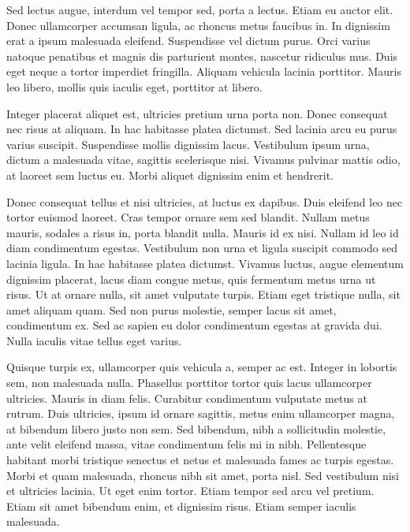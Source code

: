 \documentclass[12pt,a4paper]{article}
\begin{document}
Sed lectus augue, interdum vel tempor sed, porta a lectus. Etiam eu auctor elit. Donec ullamcorper accumsan ligula, ac rhoncus metus faucibus in. In dignissim erat a ipsum malesuada eleifend. Suspendisse vel dictum purus. Orci varius natoque penatibus et magnis dis parturient montes, nascetur ridiculus mus. Duis eget neque a tortor imperdiet fringilla. Aliquam vehicula lacinia porttitor. Mauris leo libero, mollis quis iaculis eget, porttitor at libero.

Integer placerat aliquet est, ultricies pretium urna porta non. Donec consequat nec risus at aliquam. In hac habitasse platea dictumst. Sed lacinia arcu eu purus varius suscipit. Suspendisse mollis dignissim lacus. Vestibulum ipsum urna, dictum a malesuada vitae, sagittis scelerisque nisi. Vivamus pulvinar mattis odio, at laoreet sem luctus eu. Morbi aliquet dignissim enim et hendrerit.

Donec consequat tellus et nisi ultricies, at luctus ex dapibus. Duis eleifend leo nec tortor euismod laoreet. Cras tempor ornare sem sed blandit. Nullam metus mauris, sodales a risus in, porta blandit nulla. Mauris id ex nisi. Nullam id leo id diam condimentum egestas. Vestibulum non urna et ligula suscipit commodo sed lacinia ligula. In hac habitasse platea dictumst. Vivamus luctus, augue elementum dignissim placerat, lacus diam congue metus, quis fermentum metus urna ut risus. Ut at ornare nulla, sit amet vulputate turpis. Etiam eget tristique nulla, sit amet aliquam quam. Sed non purus molestie, semper lacus sit amet, condimentum ex. Sed ac sapien eu dolor condimentum egestas at gravida dui. Nulla iaculis vitae tellus eget varius.

Quisque turpis ex, ullamcorper quis vehicula a, semper ac est. Integer in lobortis sem, non malesuada nulla. Phasellus porttitor tortor quis lacus ullamcorper ultricies. Mauris in diam felis. Curabitur condimentum vulputate metus at rutrum. Duis ultricies, ipsum id ornare sagittis, metus enim ullamcorper magna, at bibendum libero justo non sem. Sed bibendum, nibh a sollicitudin molestie, ante velit eleifend massa, vitae condimentum felis mi in nibh. Pellentesque habitant morbi tristique senectus et netus et malesuada fames ac turpis egestas. Morbi et quam malesuada, rhoncus nibh sit amet, porta nisl. Sed vestibulum nisi et ultricies lacinia. Ut eget enim tortor. Etiam tempor sed arcu vel pretium. Etiam sit amet bibendum enim, et dignissim risus. Etiam semper iaculis malesuada.


\clearpage
\printbibliography[title={\centering REFERÊNCIAS}] %
\end{document}
